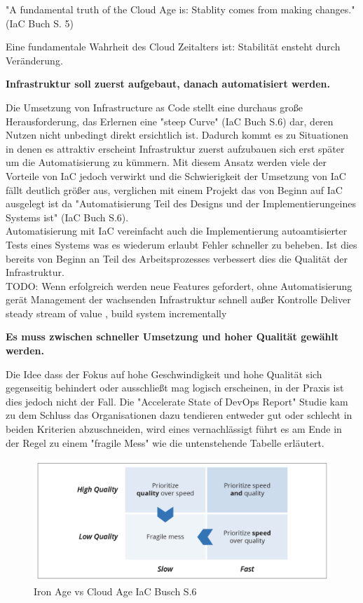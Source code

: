 \begin{spacing}{1.2}
"A fundamental truth of the Cloud Age is: Stablity comes from making changes."
(IaC Buch S. 5)

Eine fundamentale Wahrheit des Cloud Zeitalters ist: Stabilität ensteht durch
Veränderung.

\textbf{Infrastruktur soll zuerst aufgebaut, danach automatisiert werden.}

Die Umsetzung von Infrastructure as Code stellt eine durchaus große
Herausforderung, das Erlernen eine "steep Curve" (IaC Buch S.6) dar, deren
Nutzen nicht unbedingt direkt ersichtlich ist. Dadurch kommt es zu
Situationen in denen es attraktiv erscheint Infrastruktur zuerst aufzubauen
sich erst später um die Automatisierung zu kümmern. Mit diesem
Ansatz werden viele der Vorteile von IaC jedoch verwirkt und die Schwierigkeit
der Umsetzung von IaC fällt deutlich größer aus, verglichen mit einem
Projekt das von Beginn auf IaC ausgelegt ist da 
"Automatisierung Teil des Designs und der Implementierungeines Systems ist"
(IaC Buch S.6).\\
Automatisierung mit IaC vereinfacht auch die Implementierung autoamtisierter
Tests eines Systems was es wiederum erlaubt Fehler schneller zu beheben.
Ist dies bereits von Beginn an Teil des Arbeitsprozesses verbessert dies
die Qualität der Infrastruktur.\\

TODO: Wenn erfolgreich werden neue Features gefordert, ohne Automatisierung
gerät Management der wachsenden Infrastruktur schnell außer Kontrolle
Deliver steady stream of value , build system incrementally

\textbf{Es muss zwischen schneller Umsetzung und hoher Qualität
gewählt werden.}

Die Idee dass der Fokus auf hohe Geschwindigkeit und hohe Qualität
sich gegenseitig behindert oder ausschließt mag logisch erscheinen,
in der Praxis ist dies jedoch nicht der Fall.
Die "Accelerate State of DevOps Report" Studie kam zu dem Schluss
das Organisationen dazu tendieren entweder gut oder schlecht in beiden
Kriterien abzuschneiden, wird eines vernachlässigt führt es am Ende
in der Regel zu einem "fragile Mess" wie die untenstehende Tabelle
erläutert.

\begin{figure}[H]
  \includegraphics[width=1.0\textwidth]{fig/hauptteil/Speed_vs_Quality.png}
  \caption{Iron Age vs Cloud Age IaC Busch S.6}
  \centering
\end{figure}


\end{spacing}
